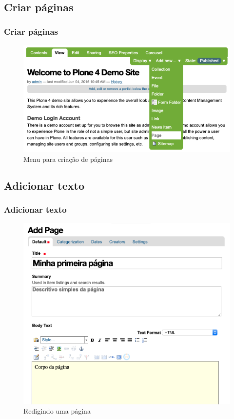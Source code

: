 \documentclass{beamer}
\begin{document}
\subsection{Criar páginas}
\begin{frame}
    \frametitle{Criar páginas}
    \begin{figure}
        \includegraphics[width=.7\textwidth]{./img/001-002_-_create_page.png}
        \caption{Menu para criação de páginas}
    \end{figure}
\end{frame}

\subsection{Adicionar texto}
\begin{frame}
    \frametitle{Adicionar texto}
    \begin{figure}
        \includegraphics[height=.7\textheight]{./img/001-003_-_adicionar_texto.png}
        \caption{Redigindo uma página}
    \end{figure}
\end{frame}
\end{document}
